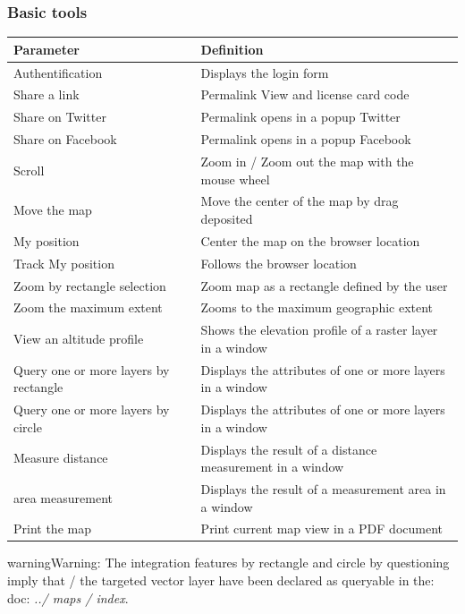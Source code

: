 \documentclass[letterpaper,10pt,english]{sphinxmanual}
\begin{document}
\subsubsection{Basic tools}
\label{apps/appconfig:outils-de-base}
\begin{tabulary}{\linewidth}{|L|L|}
\hline

\textbf{Parameter}
 & 
\textbf{Definition}
\\
\hline
Authentification
 & 
Displays the login form
\\
\hline
Share a link
 & 
Permalink View and license card code
\\
\hline
Share on Twitter
 & 
Permalink opens in a popup Twitter
\\
\hline
Share on Facebook
 & 
Permalink opens in a popup Facebook
\\
\hline
Scroll
 & 
Zoom in / Zoom out the map with the mouse wheel
\\
\hline
Move the map
 & 
Move the center of the map by drag deposited
\\
\hline
My position
 & 
Center the map on the browser location
\\
\hline
Track My position
 & 
Follows the browser location
\\
\hline
Zoom by rectangle selection
 & 
Zoom map as a rectangle defined by the user
\\
\hline
Zoom the maximum extent
 & 
Zooms to the maximum geographic extent
\\
\hline
View an altitude profile
 & 
Shows the elevation profile of a raster layer in a window
\\
\hline
Query one or more layers by rectangle
 & 
Displays the attributes of one or more layers in a window
\\
\hline
Query one or more layers by circle
 & 
Displays the attributes of one or more layers in a window
\\
\hline
Measure distance
 & 
Displays the result of a distance measurement in a window
\\
\hline
area measurement
 & 
Displays the result of a measurement area in a window
\\
\hline
Print the map
 & 
Print current map view in a PDF document
\\
\hline\end{tabulary}


\begin{notice}{warning}{Warning:}
The integration features by rectangle and circle by questioning imply that / the targeted vector layer have been declared as queryable in the: doc: \emph{../ maps / index}.
\end{notice}
\end{document}
